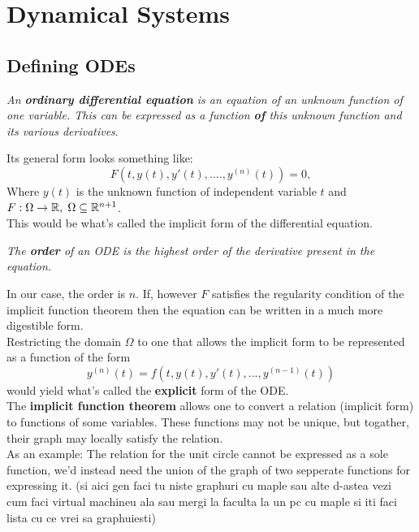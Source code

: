 \chapter{Dynamical Systems}
\label{chap:ch3}


\section{Defining ODEs}
\begin{definition}
    \textit{An \textbf{ordinary differential equation} is an equation of an unknown function of one variable. This can be expressed as a function \textbf{of} this unknown function and its various derivatives}.
\end{definition}
Its general form looks something like:
\begin{equation}\label{eq:3.1.1}
    F(t,y(t),y'(t),....,y^{(n)}(t))=0,
\end{equation}
Where $y(t)$ is the unknown function of independent variable $t$ and $F : \Omega \rightarrow \mathbb{R},\hspace{0.1cm}\Omega \subseteq \mathbb{R}^{n+1}$. \\
This would be what's called the implicit form of the differential equation.

\begin{definition}
    \textit{The \textbf{order} of an ODE is the highest order of the derivative present in the equation.}
\end{definition}
In our case, the order is $n$.
If, however $F$ satisfies the regularity condition of the implicit function theorem then the equation can be written in a much more digestible form. \\
Restricting the domain $\Omega$ to one that allows the implicit form to be represented as a function of the form
$$
    y^{(n)}(t)=f(t,y(t),y'(t),...,y^{(n-1)}(t))
$$
would yield what's called the \textbf{explicit} form of the ODE. \\

The \textbf{implicit function theorem} allows one to convert a relation (implicit form) to functions of some variables. These functions may not be unique, but togather, their graph may locally satisfy the relation. \\
As an example: The relation for the unit circle cannot be expressed as a sole function, we'd instead need the union of the graph of two sepperate functions for expressing it.
(si aici gen faci tu niste graphuri cu maple sau alte d-astea vezi cum faci virtual machineu ala sau mergi la faculta la un pc cu maple si iti faci lista cu ce vrei sa graphuiesti)


